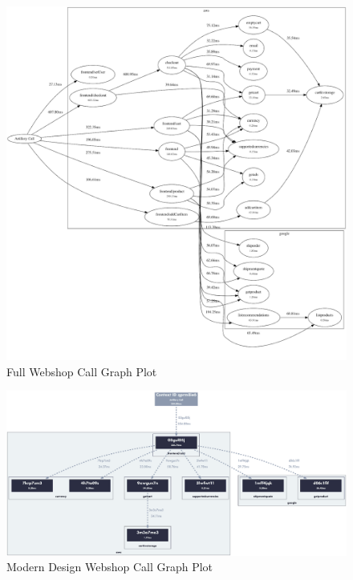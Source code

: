 \documentclass[../main.tex]{subfiles}
\begin{document}
\begin{figure}
\begin{center}
  \includegraphics[width=\linewidth,keepaspectratio]{./webshop-call-graph.png}
\end{center}
\caption{Full Webshop Call Graph Plot}%
\label{fig:webshop_full_call_graph}
\end{figure}

\begin{figure}
\begin{center}
  \includegraphics[width=\linewidth,keepaspectratio]{./webshop-call-graph-modern.png}
\end{center}
\caption{Modern Design Webshop Call Graph Plot}%
\label{fig:webshop_modern_call_graph}
\end{figure}
\end{document}
